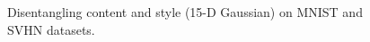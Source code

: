 \documentclass{article}
\begin{document}
\begin{figure}[b]
\centering
{}
\caption{\label{fig_disentangle}Disentangling content and style (15-D Gaussian) on MNIST and SVHN datasets.}
\end{figure}
\end{document}
